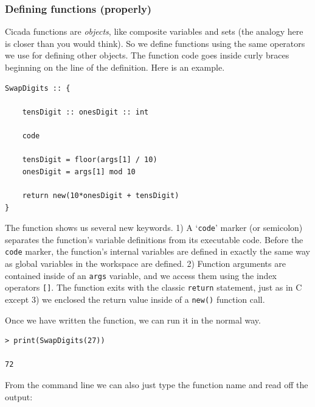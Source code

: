 \documentclass{article}
\newenvironment{code}{
       \begin{list}{}{
               \setlength{\leftmargin}{.4in}
               \setlength{\rightmargin}{0in}
               \setlength{\topsep}{.2in}
       }
       \small
       \item[] }
       { \end{list}   }
\begin{document}

\subsubsection{Defining functions (properly)}

Cicada functions are \emph{objects}, like composite variables and sets (the analogy here is closer than you would think).  So we define functions using the same operators we use for defining other objects.  The function code goes inside curly braces beginning on the line of the definition.  Here is an example.

\begin{code} \begin{verbatim}
SwapDigits :: {
    
    tensDigit :: onesDigit :: int
    
    code
    
    tensDigit = floor(args[1] / 10)
    onesDigit = args[1] mod 10
    
    return new(10*onesDigit + tensDigit)
}
\end{verbatim} \end{code}

\noindent The function shows us several new keywords.  1) A `\texttt{code}' marker (or semicolon) separates the function's variable definitions from its executable code.  Before the \verb#code# marker, the function's internal variables are defined in exactly the same way as global variables in the workspace are defined.  2) Function arguments are contained inside of an \texttt{args} variable, and we access them using the index operators \verb#[]#.  The function exits with the classic \texttt{return} statement, just as in C except 3) we enclosed the return value inside of a \verb#new()# function call.

Once we have written the function, we can run it in the normal way.

\begin{code} \begin{verbatim}
> print(SwapDigits(27))

72
\end{verbatim} \end{code}

\noindent From the command line we can also just type the function name and read off the output:
\end{document}
